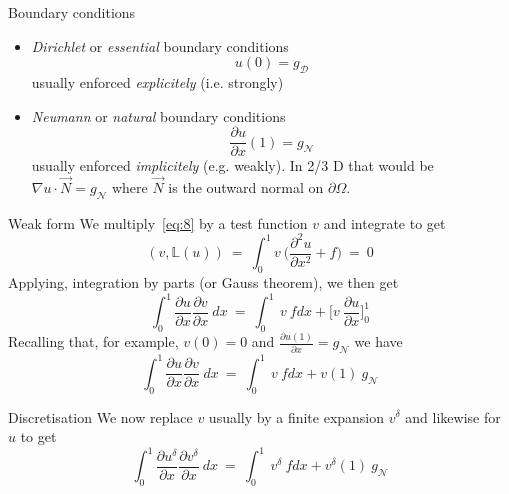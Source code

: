 \begin{frame}{Boundary conditions}
  \begin{itemize}
  \item \emph{Dirichlet} or \emph{essential} boundary conditions
    \begin{equation}
      \label{eq:10}
      u(0) = g_{\mathcal{D}}
    \end{equation}
    usually enforced \emph{explicitely} (i.e. strongly)
  \item \emph{Neumann} or \emph{natural} boundary conditions
    \begin{equation}
      \label{eq:11}
      \frac{\partial u}{\partial x}(1) = g_{\mathcal{N}}
    \end{equation}
    usually enforced \emph{implicitely} (e.g. weakly). In 2/3 D that
    would be $\nabla u \cdot \overrightarrow{N} = g_{\mathcal{N}}$ where $\overrightarrow{N}$ is the outward normal  on $\partial \Omega$.
  \end{itemize}
\end{frame}

\begin{frame}{Weak form}
  We multiply~\eqref{eq:8} by  a test function $v$ and integrate to get
  \begin{equation}
    \label{eq:12}
    (v, \mathbb{L}(u))\ =\ \int_0^1 v\ \Big( \frac{\partial^2 u}{\partial x^2} + f \Big)\ =\ 0
  \end{equation}
  Applying, integration by parts (or Gauss theorem), we then get
  \begin{equation}
    \label{eq:13}
    \int_0^1 \frac{\partial u}{\partial x}\frac{\partial v}{\partial x}\ dx\ =\  \int_0^1\ v\ f dx + \Big[ v\ \frac{\partial u}{\partial x} \Big]_0^1
  \end{equation}
  Recalling that, for example, $v(0) = 0$ and $\frac{\partial u(1)}{\partial x} = g_{\mathcal{N}}$ we have
  \begin{equation}
    \label{eq:14}
    \int_0^1 \frac{\partial u}{\partial x}\frac{\partial v}{\partial x}\ dx\ =\  \int_0^1\ v\ f dx + v(1)\ g_{\mathcal{N}}
  \end{equation}
\end{frame}
\begin{frame}{Discretisation}
  We now replace $v$ usually by a finite expansion $v^{\delta}$ and likewise for $u$ to get
  \begin{equation}
    \label{eq:16}
    \int_0^1 \frac{\partial u^{\delta}}{\partial x}\frac{\partial v^{\delta}}{\partial x}\ dx\ =\  \int_0^1\ v^{\delta}\ f dx + v^{\delta}(1)\ g_{\mathcal{N}}
  \end{equation}
\end{frame}

